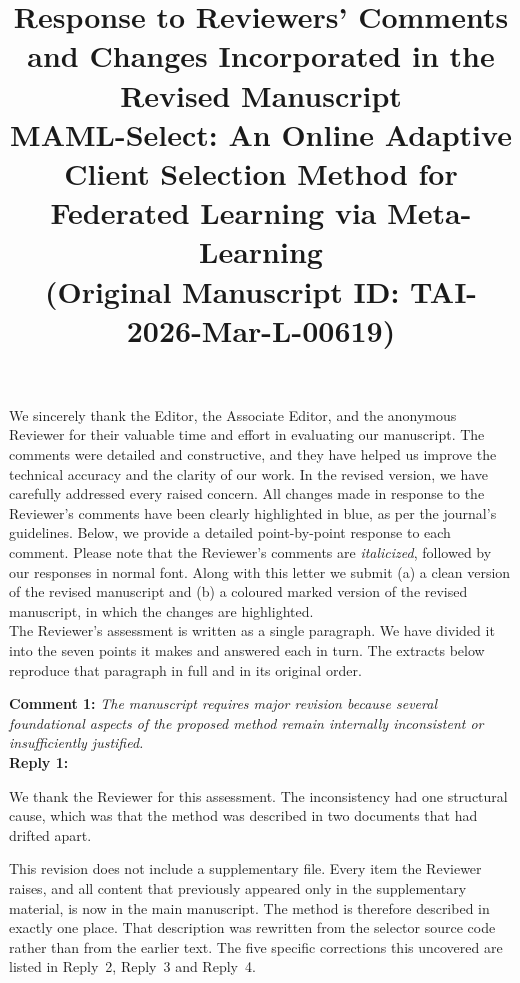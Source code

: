 \documentclass[10pt]{article}
\newcommand{\paperTitle}{MAML-Select: An Online Adaptive Client Selection Method for Federated Learning via Meta-Learning}
\begin{document}
\title{
\small Response to Reviewers' Comments and Changes Incorporated in the Revised Manuscript \\
\vspace{1em}
{\Large \bf \paperTitle} \\
(\textbf{Original Manuscript ID: TAI-2026-Mar-L-00619})
}
\date{}
\maketitle

\vspace{-3em}

We sincerely thank the Editor, the Associate Editor, and the anonymous Reviewer for their valuable time and effort in evaluating our manuscript. The comments were detailed and constructive, and they have helped us improve the technical accuracy and the clarity of our work. In the revised version, we have carefully addressed every raised concern. {\color{blue}All changes made in response to the Reviewer's comments have been clearly highlighted in blue, as per the journal's guidelines}. Below, we provide a detailed point-by-point response to each comment. Please note that the Reviewer's comments are \textit{italicized}, followed by our responses in normal font. Along with this letter we submit (a) a clean version of the revised manuscript and (b) a coloured marked version of the revised manuscript, in which the changes are highlighted.\\

The Reviewer's assessment is written as a single paragraph. We have divided it into the seven points it makes and answered each in turn. The extracts below reproduce that paragraph in full and in its original order.\\


\noindent
\textbf{Comment 1:} \textit{The manuscript requires major revision because several foundational aspects of the proposed method remain internally inconsistent or insufficiently justified.}\\
\noindent
\textbf{Reply 1:} {We thank the Reviewer for this assessment. The inconsistency had one structural cause, which was that the method was described in two documents that had drifted apart.

This revision does not include a supplementary file. Every item the Reviewer raises, and all content that previously appeared only in the supplementary material, is now in the main manuscript. The method is therefore described in exactly one place. That description was rewritten from the selector source code rather than from the earlier text. The five specific corrections this uncovered are listed in Reply~2, Reply~3 and Reply~4.}\\
\end{document}
